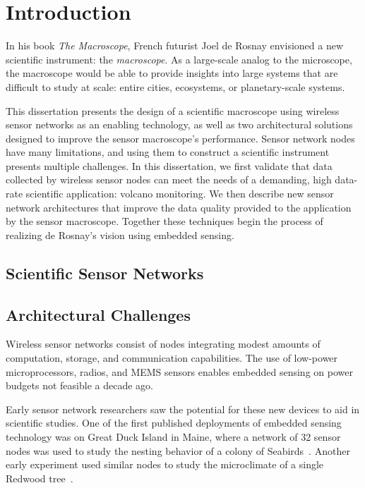 \chapter{Introduction}
\label{chap-introduction}

In his book \textit{The Macroscope}, French futurist Joel de Rosnay
envisioned a new scientific instrument: the \textit{macroscope}. As a
large-scale analog to the microscope, the macroscope would be able to provide
insights into large systems that are difficult to study at scale: entire
cities, ecosystems, or planetary-scale systems.

This dissertation presents the design of a scientific macroscope using
wireless sensor networks as an enabling technology, as well as two
architectural solutions designed to improve the sensor macroscope's
performance. Sensor network nodes have many limitations, and using them to
construct a scientific instrument presents multiple challenges. In this
dissertation, we first validate that data collected by wireless sensor nodes
can meet the needs of a demanding, high data-rate scientific application:
volcano monitoring. We then describe new sensor network architectures that
improve the data quality provided to the application by the sensor
macroscope. Together these techniques begin the process of realizing de
Rosnay's vision using embedded sensing.

\section{Scientific Sensor Networks}


\section{Architectural Challenges}

Wireless sensor networks consist of nodes integrating modest amounts of
computation, storage, and communication capabilities. The use of low-power
microprocessors, radios, and MEMS sensors enables embedded sensing on power
budgets not feasible a decade ago.

Early sensor network researchers saw the potential for these new devices to
aid in scientific studies. One of the first published deployments of embedded
sensing technology was on Great Duck Island in Maine, where a network of 32
sensor nodes was used to study the nesting behavior of a colony of
Seabirds~\cite{gdi-sensys04}. Another early experiment used similar nodes to
study the microclimate of a single Redwood tree~\cite{berkeley-redwoods}.

